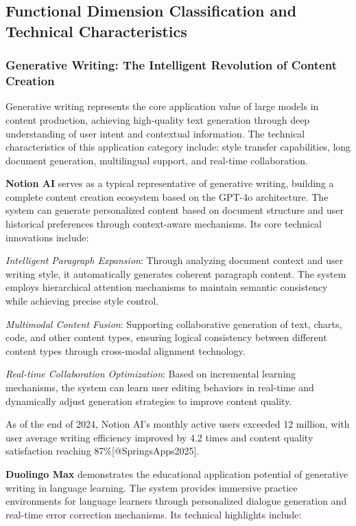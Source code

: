 \documentclass{article}
\begin{document}
\subsection{Functional Dimension Classification and Technical Characteristics}

\subsubsection{Generative Writing: The Intelligent Revolution of Content Creation}
Generative writing represents the core application value of large models in content production, achieving high-quality text generation through deep understanding of user intent and contextual information. The technical characteristics of this application category include: style transfer capabilities, long document generation, multilingual support, and real-time collaboration.

\textbf{Notion AI} serves as a typical representative of generative writing, building a complete content creation ecosystem based on the GPT-4o architecture. The system can generate personalized content based on document structure and user historical preferences through context-aware mechanisms. Its core technical innovations include:

\textit{Intelligent Paragraph Expansion}: Through analyzing document context and user writing style, it automatically generates coherent paragraph content. The system employs hierarchical attention mechanisms to maintain semantic consistency while achieving precise style control.

\textit{Multimodal Content Fusion}: Supporting collaborative generation of text, charts, code, and other content types, ensuring logical consistency between different content types through cross-modal alignment technology.

\textit{Real-time Collaboration Optimization}: Based on incremental learning mechanisms, the system can learn user editing behaviors in real-time and dynamically adjust generation strategies to improve content quality.

As of the end of 2024, Notion AI's monthly active users exceeded 12 million, with user average writing efficiency improved by 4.2 times and content quality satisfaction reaching 87\%[@SpringsApps2025].

\textbf{Duolingo Max} demonstrates the educational application potential of generative writing in language learning. The system provides immersive practice environments for language learners through personalized dialogue generation and real-time error correction mechanisms. Its technical highlights include:
\end{document}

